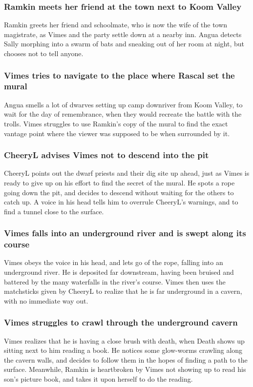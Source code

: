 \subsubsection{\Gls{Ramkin} meets her friend at the town next to Koom Valley}
\Gls{Ramkin} greets her friend and schoolmate, who is now the wife of the town magistrate, as
\Gls{Vimes} and the party settle down at a nearby inn. \Gls{Angua} detects \Gls{Sally} morphing into
a swarm of bats and sneaking out of her room at night, but chooses not to tell anyone.

\subsubsection{\Gls{Vimes} tries to navigate to the place where \Gls{Rascal} set the mural}
\Gls{Angua} smells a lot of dwarves setting up camp downriver from Koom Valley, to wait for the
day of remembrance, when they would recreate the battle with the trolls. \Gls{Vimes} struggles to
use \Gls{Ramkin}'s copy of the mural to find the exact vantage point where the viewer was supposed
to be when surrounded by it.

\subsubsection{\Gls{CheeryL} advises \Gls{Vimes} not to descend into the pit}
\Gls{CheeryL} points out the dwarf priests and their dig site up ahead, just as \Gls{Vimes} is
ready to give up on his effort to find the secret of the mural. He spots a rope going down the
pit, and decides to descend without waiting for the others to catch up. A voice in his head tells
him to overrule \Gls{CheeryL}'s warnings, and to find a tunnel close to the surface.

\subsubsection{\Gls{Vimes} falls into an underground river and is swept along its course}
\Gls{Vimes} obeys the voice in his head, and lets go of the rope, falling into an underground river.
He is deposited far downstream, having been bruised and battered by the many waterfalls in the
river's course. \Gls{Vimes} then uses the matchsticks given by \Gls{CheeryL} to realize that he is
far underground in a cavern, with no immediate way out.

\subsubsection{\Gls{Vimes} struggles to crawl through the underground cavern}
\Gls{Vimes} realizes that he is having a close brush with death, when \Gls{Death} shows up sitting
next to him reading a book. He notices some glow-worms crawling along the cavern walls, and decides
to follow them in the hopes of finding a path to the surface. Meanwhile, \Gls{Ramkin} is heartbroken
by \Gls{Vimes} not showing up to read his son's picture book, and takes it upon herself to do the
reading.

